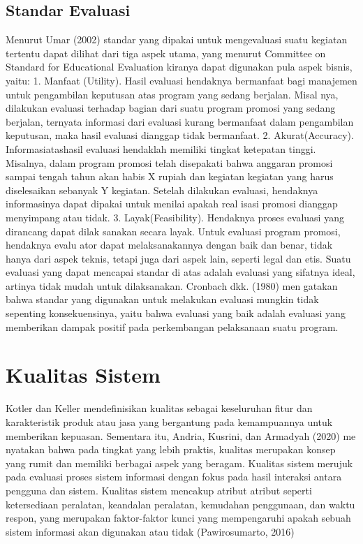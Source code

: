 \subsection{Standar Evaluasi}
Menurut Umar (2002) standar yang dipakai untuk mengevaluasi suatu kegiatan tertentu dapat dilihat dari tiga aspek utama, yang menurut Committee on Standard for Educational Evaluation kiranya dapat digunakan pula aspek bisnis, yaitu: 1. Manfaat (Utility). Hasil evaluasi hendaknya bermanfaat bagi manajemen untuk pengambilan keputusan atas program yang sedang berjalan. Misal nya, dilakukan evaluasi terhadap bagian dari suatu program promosi yang sedang berjalan, ternyata informasi dari evaluasi kurang bermanfaat dalam pengambilan keputusan, maka hasil evaluasi dianggap tidak bermanfaat. 2. Akurat(Accuracy). Informasiatashasil evaluasi hendaklah memiliki tingkat ketepatan tinggi. Misalnya, dalam program promosi telah disepakati bahwa anggaran promosi sampai tengah tahun akan habis X rupiah dan kegiatan kegiatan yang harus diselesaikan sebanyak Y kegiatan. Setelah dilakukan evaluasi, hendaknya informasinya dapat dipakai untuk menilai apakah real isasi promosi dianggap menyimpang atau tidak. 3. Layak(Feasibility). Hendaknya proses evaluasi yang dirancang dapat dilak sanakan secara layak. Untuk evaluasi program promosi, hendaknya evalu ator dapat melaksanakannya dengan baik dan benar, tidak hanya dari aspek teknis, tetapi juga dari aspek lain, seperti legal dan etis. Suatu evaluasi yang dapat mencapai standar di atas adalah evaluasi yang sifatnya ideal, artinya tidak mudah untuk dilaksanakan. Cronbach dkk. (1980) men gatakan bahwa standar yang digunakan untuk melakukan evaluasi mungkin tidak sepenting konsekuensinya, yaitu bahwa evaluasi yang baik adalah evaluasi yang memberikan dampak positif pada perkembangan pelaksanaan suatu program.

\section{Kualitas Sistem}
Kotler dan Keller mendefinisikan kualitas sebagai keseluruhan fitur dan karakteristik produk atau jasa yang bergantung pada kemampuannya untuk memberikan kepuasan. Sementara itu, Andria, Kusrini, dan Armadyah (2020) me nyatakan bahwa pada tingkat yang lebih praktis, kualitas merupakan konsep yang rumit dan memiliki berbagai aspek yang beragam. Kualitas sistem merujuk pada evaluasi proses sistem informasi dengan fokus pada hasil interaksi antara pengguna dan sistem. Kualitas sistem mencakup atribut atribut seperti ketersediaan peralatan, keandalan peralatan, kemudahan penggunaan, dan waktu respon, yang merupakan faktor-faktor kunci yang mempengaruhi apakah sebuah sistem informasi akan digunakan atau tidak (Pawirosumarto, 2016)

